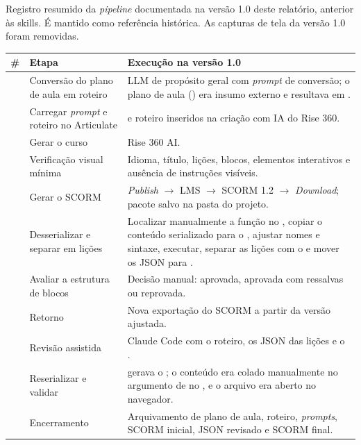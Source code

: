 \documentclass[12pt,a4paper]{article}
\newcommand{\flecha}{\ensuremath{\rightarrow}}
\begin{document}
Registro resumido da \textit{pipeline} documentada na versão 1.0 deste relatório, anterior às skills. É mantido como referência histórica. As capturas de tela da versão 1.0 foram removidas.

\begingroup\small
\renewcommand{\arraystretch}{1.3}
\begin{longtable}{@{}C{0.05\textwidth}L{0.28\textwidth}L{0.61\textwidth}@{}}
\toprule
\textbf{\#} & \textbf{Etapa} & \textbf{Execução na versão 1.0} \\
\midrule
\endhead
\bottomrule
{} & Conversão do plano de aula em roteiro & LLM de propósito geral com \textit{prompt} de conversão; o plano de aula () era insumo externo e resultava em . \\
 & Carregar \textit{prompt} e roteiro no Articulate &  e roteiro inseridos na criação com IA do Rise 360. \\
 & Gerar o curso & Rise 360 AI. \\
 & Verificação visual mínima & Idioma, título, lições, blocos, elementos interativos e ausência de instruções visíveis. \\
 & Gerar o SCORM & \textit{Publish} \flecha{} LMS \flecha{} SCORM 1.2 \flecha{} \textit{Download}; pacote salvo na pasta do projeto. \\
 & Desserializar e separar em lições & Localizar manualmente a função  no , copiar o conteúdo serializado para o , ajustar nomes e sintaxe, executar, separar as lições com o  e mover os JSON para . \\
 & Avaliar a estrutura de blocos & Decisão manual: aprovada, aprovada com ressalvas ou reprovada. \\
 & Retorno & Nova exportação do SCORM a partir da versão ajustada. \\
 & Revisão assistida & Claude Code com o roteiro, os JSON das lições e o . \\
 & Reserializar e validar &  gerava o ; o conteúdo era colado manualmente no argumento de  no , e o arquivo era aberto no navegador. \\
 & Encerramento & Arquivamento de plano de aula, roteiro, \textit{prompts}, SCORM inicial, JSON revisado e SCORM final. \\
\end{longtable}
\endgroup
\end{document}
